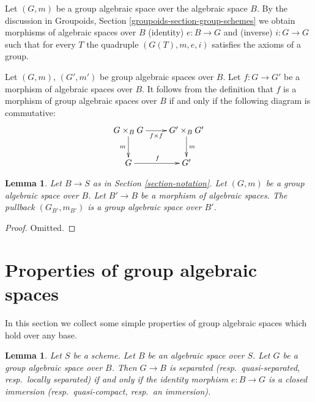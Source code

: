 \documentclass{stacks-project}
\theoremstyle{plain}
\newtheorem{lemma}[subsection]{Lemma}
\theoremstyle{definition}
\theoremstyle{remark}
\numberwithin{equation}{subsection}
\begin{document}
\noindent
Let $(G, m)$ be a group algebraic space over the algebraic space $B$.
By the discussion in
Groupoids, Section \ref{groupoids-section-group-schemes}
we obtain morphisms of algebraic spaces over $B$
(identity) $e : B \to G$ and (inverse) $i : G \to G$ such that
for every $T$ the quadruple $(G(T), m, e, i)$ satisfies the
axioms of a group.

\medskip\noindent
Let $(G, m)$, $(G', m')$ be group algebraic spaces over $B$.
Let $f : G \to G'$ be a morphism of algebraic spaces over $B$.
It follows from the definition that $f$ is a morphism
of group algebraic spaces over $B$ if and only if the following diagram
is commutative:
$$
\xymatrix{
G \times_B G \ar[r]_-{f \times f} \ar[d]_m &
G' \times_B G' \ar[d]^m \\
G \ar[r]^f & G'
}
$$

\begin{lemma}
\label{lemma-base-change-group-space}
Let $B \to S$ as in Section \ref{section-notation}.
Let $(G, m)$ be a group algebraic space over $B$.
Let $B' \to B$ be a morphism of algebraic spaces.
The pullback $(G_{B'}, m_{B'})$ is a group algebraic space over $B'$.
\end{lemma}

\begin{proof}
Omitted.
\end{proof}








\section{Properties of group algebraic spaces}
\label{section-properties-group-spaces}

\noindent
In this section we collect some simple properties of group algebraic spaces
which hold over any base.

\begin{lemma}
\label{lemma-group-scheme-separated}
Let $S$ be a scheme. Let $B$ be an algebraic space over $S$.
Let $G$ be a group algebraic space over $B$.
Then $G \to B$ is separated (resp.\ quasi-separated, resp.\ locally separated)
if and only if the identity morphism $e : B \to G$ is a closed immersion
(resp.\ quasi-compact, resp.\ an immersion).
\end{lemma}
\end{document}
